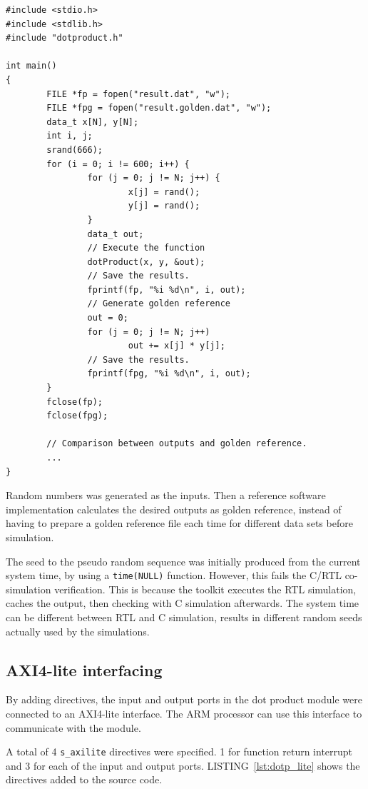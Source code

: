 \documentclass[journal]{IEEEtran}
\newcommand{\lref}[1]{LISTING~\ref{#1}}
\begin{document}
\begin{lstlisting}[caption={Test bench for the dot product module},captionpos=b,label=lst:dotp_tb]
#include <stdio.h>
#include <stdlib.h>
#include "dotproduct.h"

int main()
{
        FILE *fp = fopen("result.dat", "w");
        FILE *fpg = fopen("result.golden.dat", "w");
        data_t x[N], y[N];
        int i, j;
        srand(666);
        for (i = 0; i != 600; i++) {
                for (j = 0; j != N; j++) {
                        x[j] = rand();
                        y[j] = rand();
                }
                data_t out;
                // Execute the function
                dotProduct(x, y, &out);
                // Save the results.
                fprintf(fp, "%i %d\n", i, out);
                // Generate golden reference
                out = 0;
                for (j = 0; j != N; j++)
                        out += x[j] * y[j];
                // Save the results.
                fprintf(fpg, "%i %d\n", i, out);
        }
        fclose(fp);
        fclose(fpg);
        
        // Comparison between outputs and golden reference.
        ...
}
\end{lstlisting}

Random numbers was generated as the inputs. Then a reference software implementation calculates the desired outputs as golden reference, instead of having to prepare a golden reference file each time for different data sets before simulation.

The seed to the pseudo random sequence was initially produced from the current system time, by using a \texttt{time(NULL)} function. However, this fails the C/RTL co-simulation verification. This is because the toolkit executes the RTL simulation, caches the output, then checking with C simulation afterwards. The system time can be different between RTL and C simulation, results in different random seeds actually used by the simulations.

\subsection{AXI4-lite interfacing}

By adding directives, the input and output ports in the dot product module were connected to an AXI4-lite interface. The ARM processor can use this interface to communicate with the module.

A total of 4 \texttt{s\_axilite} directives were specified. 1 for function return interrupt and 3 for each of the input and output ports. \lref{lst:dotp_lite} shows the directives added to the source code.
\end{document}
